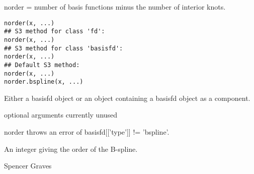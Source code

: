 \documentclass{article}
\begin{document}
\begin{Description}\relax
norder = number of basis functions minus the number of interior
knots.
\end{Description}
\begin{Usage}
\begin{verbatim}
norder(x, ...) 
## S3 method for class 'fd':
norder(x, ...)
## S3 method for class 'basisfd':
norder(x, ...)
## Default S3 method:
norder(x, ...)
norder.bspline(x, ...) 
\end{verbatim}
\end{Usage}
\begin{Arguments}
\begin{ldescription}
\item[\code{x}] Either a basisfd object or an object containing a basisfd object as
a component.  

\item[\code{...}] optional arguments currently unused
\end{ldescription}
\end{Arguments}
\begin{Details}\relax
norder throws an error of basisfd[['type']] != 'bspline'.
\end{Details}
\begin{Value}
An integer giving the order of the B-spline.
\end{Value}
\begin{Author}\relax
Spencer Graves
\end{Author}
\begin{SeeAlso}\relax
{}
\end{SeeAlso}
\end{document}
